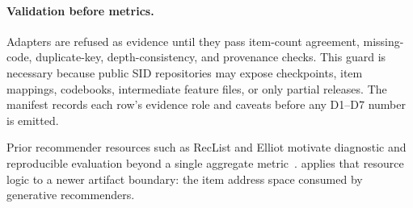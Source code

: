 \paragraph{Validation before metrics.}
Adapters are refused as evidence until they pass item-count agreement,
missing-code, duplicate-key, depth-consistency, and provenance checks. This
guard is necessary because public SID repositories may expose checkpoints, item
mappings, codebooks, intermediate feature files, or only partial releases. The
manifest records each row's evidence role and caveats before any D1--D7 number
is emitted.

Prior recommender resources such as RecList and Elliot motivate diagnostic and
reproducible evaluation beyond a single aggregate metric~\cite{chia2022reclist,anelli2021elliot}.
\tool applies that resource logic to a newer artifact boundary: the item
address space consumed by generative recommenders.
